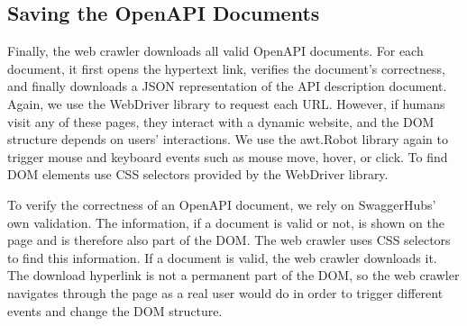 \subsection{Saving the OpenAPI Documents}
Finally, the web crawler downloads all valid OpenAPI documents. For each document, it first opens the hypertext link, verifies the document's correctness, and finally downloads a JSON representation of the API description document.
Again, we use the WebDriver library to request each URL. However, if humans visit any of these pages, they interact with a dynamic website, and the DOM structure depends on users' interactions. 
We use the awt.Robot library again to trigger mouse and keyboard events such as mouse move, hover, or click. To find DOM elements use CSS selectors provided by the WebDriver library.

To verify the correctness of an OpenAPI document, we rely on SwaggerHubs' own validation. The information, if a document is valid or not, is shown on the page and is therefore also part of the DOM. The web crawler uses CSS selectors to find this information. 
If a document is valid, the web crawler downloads it. The download hyperlink is not a permanent part of the DOM, so the web crawler navigates through the page as a real user would do in order to trigger different events and change the DOM structure.